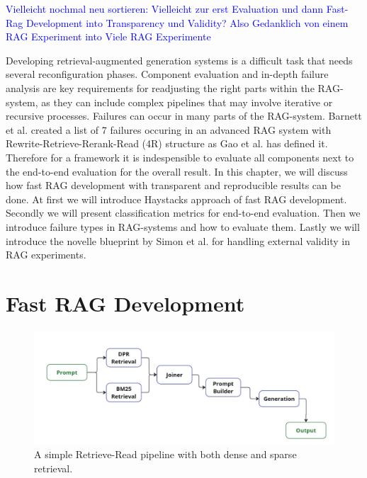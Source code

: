 
\textcolor{blue}{Vielleicht nochmal neu sortieren: Vielleicht zur erst Evaluation und dann Fast-Rag Development into Transparency und Validity? Also Gedanklich von einem RAG Experiment into Viele RAG Experimente}

Developing retrieval-augmented generation systems is a difficult task that needs several reconfiguration phases.\cite{Simon.10112024} Component evaluation and in-depth failure analysis are key requirements for readjusting the right parts within the RAG-system, as they can include complex pipelines that may involve iterative or recursive processes. Failures can occur in many parts of the RAG-system. Barnett et al.\cite{Barnett.2024} created a list of 7 failures occuring in an advanced RAG system with Rewrite-Retrieve-Rerank-Read (4R) structure as Gao et al.\cite{Gao.18.12.2023} has defined it. Therefore for a framework it is indespensible to evaluate all components next to the end-to-end evaluation for the overall result. In this chapter, we will discuss how fast RAG development with transparent and reproducible results can be done. At first we will introduce Haystacks approach of fast RAG development. Secondly we will present classification metrics for end-to-end evaluation. Then we introduce failure types in RAG-systems and how to evaluate them. Lastly we will introduce the novelle blueprint by Simon et al.\cite{Simon.10112024} for handling external validity in RAG experiments. 

\section{Fast RAG Development}

\begin{figure}[b]
    \centering
    \includegraphics[width=\textwidth]{images/showcase-pipeline.pdf}
    \caption{A simple Retrieve-Read pipeline with both dense and sparse retrieval.}
    \label{fig:showcase}
\end{figure}



